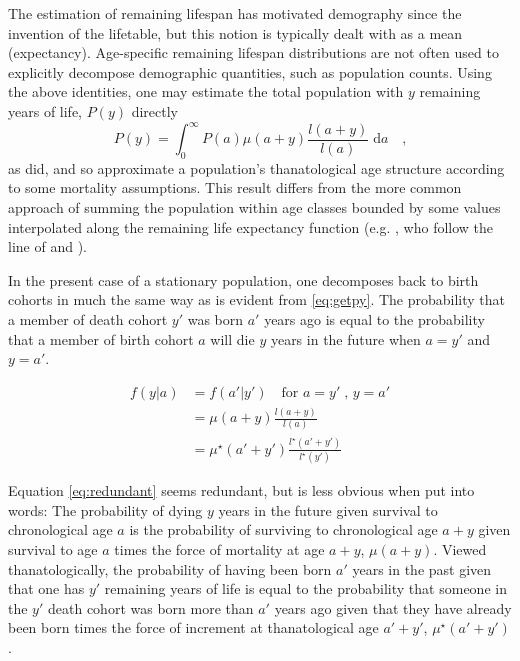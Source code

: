 \documentclass{article}
\newcommand{\dd}{\; \mathrm{d}}
\begin{document}
The estimation of remaining lifespan has motivated demography since
the invention of the lifetable, but this notion is typically dealt with as a
mean (expectancy). Age-specific remaining lifespan distributions are not often
used to explicitly decompose demographic quantities, such as population counts. Using
the above identities, one may estimate the total population with $y$
remaining years of life, $P(y)$ directly
\begin{equation}
\label{eq:getpy}
P(y) = \int _0 ^\infty P(a)\mu(a+y)\frac{l(a+y)}{l(a)} \dd a \quad \text{,}
\end{equation}
\noindent as \citet{brouard1986structure} did, and so approximate a population's
thanatological age structure according to some mortality assumptions. This result differs from the more common approach
of summing the population within age classes bounded by some values interpolated
along the remaining life expectancy function (e.g.
\citet{sanderson2005average,sanderson2007new,sanderson2010remeasuring}, who
follow the line of \citet{hersch1944demographie} and \citet{ryder1975notes}).

In the present case of a stationary population, one decomposes back to birth
cohorts in much the same way as is evident from \eqref{eq:getpy}. The
probability that a member of death cohort $y'$ was born $a'$ years ago is equal to the probability that a member of birth cohort $a$ will die $y$ years in the future when $a = y'$ and $y = a'$.

\begin{align}
f(y | a) &= f(a' | y') \quad \text{for } a = y' \;\text{, } y = a'\\
&= \mu (a+y)\frac{l(a+y)}{l(a)}\\
&= \mu^\star (a'+y')\frac{l^\star(a'+y')}{l^\star(y')} \label{eq:redundant}
\end{align}

Equation \eqref{eq:redundant} seems redundant, but is less obvious when put into
words: The probability of dying $y$ years in the future given survival to chronological age
$a$ is the probability of surviving to chronological age $a+y$ given survival to
age $a$ times the force of mortality at age $a+y$, $\mu(a+y)$. Viewed thanatologically, the
probability of having been born $a'$ years in the past given that one has $y'$
remaining years of life is equal to the probability that someone in the
$y'$ death cohort was born more than $a'$ years ago given that they have already
been born times the force of increment at thanatological age $a'+y'$, $\mu
^\star (a'+y')$.
\end{document}
